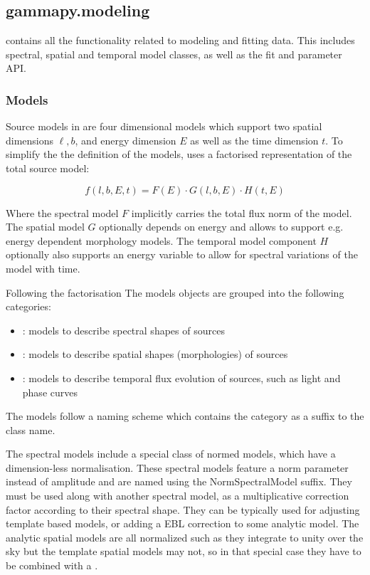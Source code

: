 \subsection{gammapy.modeling}
\label{ssec:gammapy-modeling}
%
 contains all the functionality related to modeling and fitting
data. This includes spectral, spatial and temporal model classes, as well as
the fit and parameter API.

\subsubsection{Models}
\label{sssec:models}
Source models in \gammapy are four dimensional models which support two
spatial dimensions $\ell, b$, and energy dimension $E$ as well as
the time dimension $t$. To simplify the the definition of the
models, \gammapy uses a factorised representation of the total source
model:

\begin{equation}
    f(l, b, E, t) = F(E)  \cdot G(l, b, E) \cdot  H(t, E)
\end{equation}

Where the spectral model $F$ implicitly carries the total flux
norm of the model. The spatial model $G$ optionally depends
on energy and allows to support e.g. energy dependent
morphology models. The temporal model component $H$
optionally also supports an energy variable to
allow for spectral variations of the model with time.

Following the factorisation The models objects are grouped
into the following categories:

\begin{itemize}
	\item {}: models to describe spectral shapes of sources
	\item {}: models to describe spatial shapes (morphologies) of sources
	\item {}: models to describe temporal flux evolution of sources, such as
	      light and phase curves
\end{itemize}

The models follow a naming scheme which contains the category as a suffix to
the class name.

The spectral models include a special class of normed models, which have a
dimension-less normalisation. These spectral models feature a norm parameter
instead of amplitude and are named using the NormSpectralModel suffix. They
must be used along with another spectral model, as a multiplicative correction
factor according to their spectral shape. They can be typically used for
adjusting template based models, or adding a EBL correction to some analytic
model. The analytic spatial models are all normalized such as they integrate to
unity over the sky but the template spatial models may not, so in that special
case they have to be combined with a .

